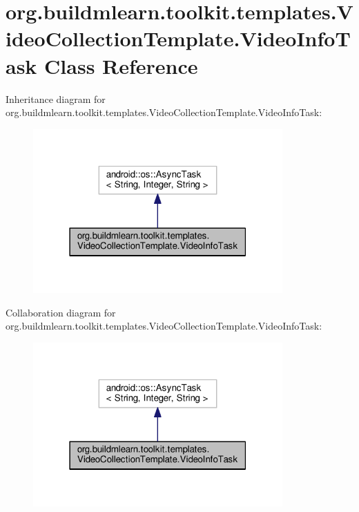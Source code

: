 \hypertarget{classorg_1_1buildmlearn_1_1toolkit_1_1templates_1_1VideoCollectionTemplate_1_1VideoInfoTask}{}\section{org.\+buildmlearn.\+toolkit.\+templates.\+Video\+Collection\+Template.\+Video\+Info\+Task Class Reference}
\label{classorg_1_1buildmlearn_1_1toolkit_1_1templates_1_1VideoCollectionTemplate_1_1VideoInfoTask}


Inheritance diagram for org.\+buildmlearn.\+toolkit.\+templates.\+Video\+Collection\+Template.\+Video\+Info\+Task\+:
\nopagebreak
\begin{figure}[H]
\begin{center}
\leavevmode
\includegraphics[width=271pt]{classorg_1_1buildmlearn_1_1toolkit_1_1templates_1_1VideoCollectionTemplate_1_1VideoInfoTask__inherit__graph}
\end{center}
\end{figure}


Collaboration diagram for org.\+buildmlearn.\+toolkit.\+templates.\+Video\+Collection\+Template.\+Video\+Info\+Task\+:
\nopagebreak
\begin{figure}[H]
\begin{center}
\leavevmode
\includegraphics[width=271pt]{classorg_1_1buildmlearn_1_1toolkit_1_1templates_1_1VideoCollectionTemplate_1_1VideoInfoTask__coll__graph}
\end{center}
\end{figure}
